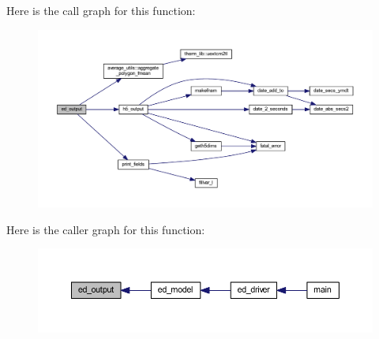 Here is the call graph for this function\+:\nopagebreak
\begin{figure}[H]
\begin{center}
\leavevmode
\includegraphics[width=350pt]{edio_8f90_ad8881e6d009ffe427f1fa02d73ccc46b_cgraph}
\end{center}
\end{figure}




Here is the caller graph for this function\+:\nopagebreak
\begin{figure}[H]
\begin{center}
\leavevmode
\includegraphics[width=350pt]{edio_8f90_ad8881e6d009ffe427f1fa02d73ccc46b_icgraph}
\end{center}
\end{figure}


